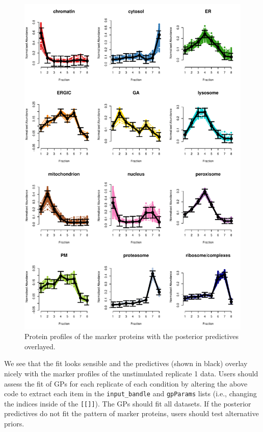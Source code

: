 \documentclass[9pt,a4paper,]{extarticle}
\begin{document}
\begin{figure}[H]

{\centering \includegraphics[width=0.9\linewidth,]{figs/gp_plot} 

}

\caption{Protein profiles of the marker proteins with the posterior predictives overlayed.}\label{fig:fig-gps-bandle}
\end{figure}

We see that the fit looks sensible and the predictives (shown in black) overlay
nicely with the marker profiles of the unstimulated replicate 1 data. Users should
assess the fit of GPs for each replicate of each condition by altering the above
code to extract each item in the \texttt{input\_bandle} and \texttt{gpParams} lists (i.e., changing
the indices inside of the \texttt{{[}{[}{]}{]}}). The GPs should fit all datasets. If the posterior
predictives do not fit the pattern of marker proteins, users should test alternative
priors.
\end{document}
